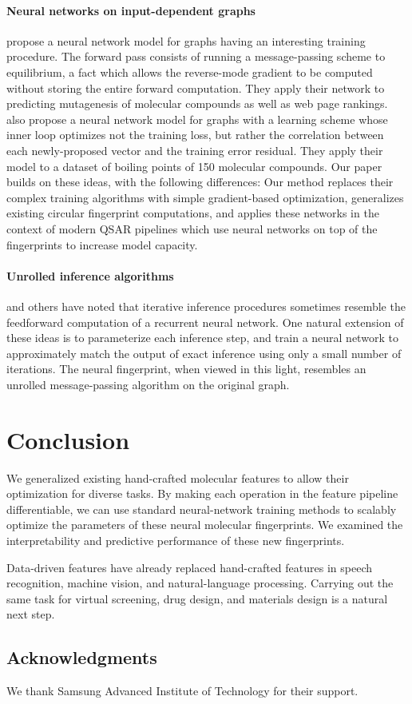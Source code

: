 \documentclass{article}
\newcommand{\citet}{\cite}
\begin{document}
\paragraph{Neural networks on input-dependent graphs}
\cite{graphnn2009} propose a neural network model for graphs having an interesting training procedure.
The forward pass consists of running a message-passing scheme to equilibrium, a fact which allows the reverse-mode gradient to be computed without storing the entire forward computation.
They apply their network to predicting mutagenesis of molecular compounds as well as web page rankings.
\cite{micheli2009neural} also propose a neural network model for graphs with a learning scheme whose inner loop optimizes not the training loss, but rather the correlation between each newly-proposed vector and the training error residual.
They apply their model to a dataset of boiling points of 150 molecular compounds.
Our paper builds on these ideas, with the following differences:
Our method replaces their complex training algorithms with simple gradient-based optimization, generalizes existing circular fingerprint computations, and applies these networks in the context of modern QSAR pipelines which use neural networks on top of the fingerprints to increase model capacity.

\paragraph{Unrolled inference algorithms}
\citet{hershey2014deep} and others have noted that iterative inference procedures sometimes resemble the feedforward computation of a recurrent neural network.
One natural extension of these ideas is to parameterize each inference step, and train a neural network to approximately match the output of exact inference using only a small number of iterations.
The neural fingerprint, when viewed in this light, resembles an unrolled message-passing algorithm on the original graph.


\section{Conclusion}
We generalized existing hand-crafted molecular features to allow their optimization for diverse tasks.
By making each operation in the feature pipeline differentiable, we can use standard neural-network training methods to scalably optimize the parameters of these neural molecular fingerprints.
We examined the interpretability and predictive performance of these new fingerprints.

Data-driven features have already replaced hand-crafted features in speech recognition, machine vision, and natural-language processing.
Carrying out the same task for virtual screening, drug design, and materials design is a natural next step.

\subsection*{Acknowledgments}
We thank  Samsung Advanced Institute of Technology for their support.


\end{document}
